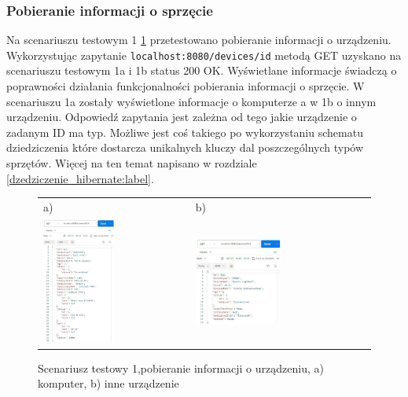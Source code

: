 \subsubsection{Pobieranie informacji o sprzęcie}
Na scenariuszu testowym 1 \ref{getByIdTest:label} przetestowano pobieranie informacji o urządzeniu. Wykorzystując zapytanie \texttt{localhost:8080/devices/{id}} metodą GET uzyskano na scenariuszu testowym 1a i 1b status 200 OK. Wyświetlane informacje świadczą o poprawności działania funkcjonalności pobierania informacji o sprzęcie. W scenariuszu 1a zostały wyświetlone informacje o komputerze a w 1b o innym urządzeniu. Odpowiedź zapytania jest zależna od tego jakie urządzenie o zadanym ID ma typ. Możliwe jest coś takiego po wykorzystaniu schematu dziedziczenia które dostarcza unikalnych kluczy dal poszczególnych typów sprzętów. Więcej na ten temat napisano w rozdziale \ref{dzedziczenie_hibernate:label}.


\begin{figure}[htb]
  \centering
	\begin{tabular}{@{}ll@{}}
	a) & b) \\
  \includegraphics[width=0.5\textwidth]{rys06/postmanTest/compById.pdf} & 
	\includegraphics[width=0.5\textwidth]{rys06/postmanTest/otherById.pdf}
	\end{tabular}
  \caption{Scenariusz testowy 1,pobieranie informacji o urządzeniu, a) komputer, b) inne urządzenie}
  \label{getByIdTest:label}
\end{figure}



